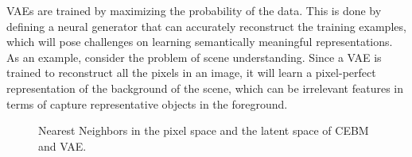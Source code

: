 \documentclass[tablecaption=bottom,wcp]{jmlr} %
\begin{document}


VAEs are trained by maximizing the probability of the data. This is done by defining a neural generator that can accurately reconstruct the training examples, which will pose challenges on learning semantically meaningful representations. As an example, consider the problem of scene understanding. Since a VAE is trained to reconstruct all the pixels in an image, it will learn a pixel-perfect representation of the background of the scene, which can be irrelevant features in terms of capture representative objects in the foreground. 

\begin{figure}[!t]
\label{fig:cebm-knn-cifar10}
\centering
{}%
\caption{Nearest Neighbors in the pixel space and the latent space of CEBM and VAE.}

\end{figure}
\end{document}
